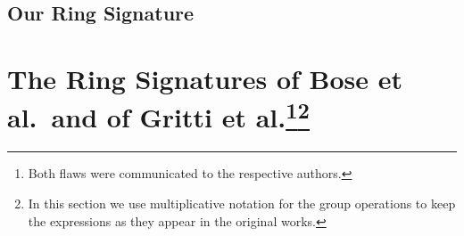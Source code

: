 \documentclass{llncs}
\begin{document}
		\subsection{Our Ring Signature}
			
			
	\section{The Ring Signatures of Bose et al.~and of Gritti et al.\protect\footnote{Both flaws were communicated to the respective authors.}\protect\footnote{In this section we use multiplicative notation for the group operations to keep the expressions as they appear in the original works.}}\label{sec:rs-flawed}
    
        	 

%
%	
%
%		
%
%
%		
%		
%
%
%
%		
%
%
%		
\end{document}
